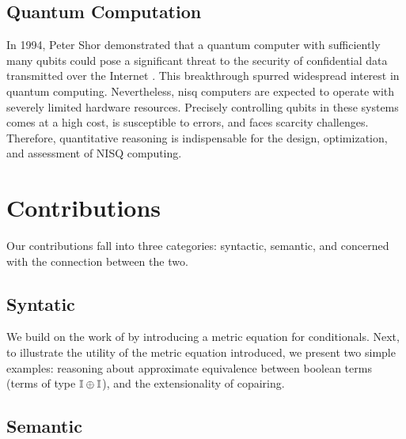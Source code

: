 \subsection*{Quantum Computation}

In 1994, Peter Shor demonstrated that a quantum computer with sufficiently many qubits could pose a significant threat to the security of confidential data transmitted over the Internet \cite{shor1994algorithms}. This breakthrough spurred widespread interest in quantum computing. Nevertheless, \acrfull{nisq}  computers are expected to operate with severely limited hardware resources. Precisely controlling qubits in these systems comes at a high cost, is susceptible to errors, and faces scarcity challenges. Therefore, quantitative reasoning is indispensable for the design, optimization, and assessment of NISQ computing. 







\section{Contributions}

Our contributions fall into three categories: syntactic, semantic, and  concerned with the connection between the two.

\subsection*{Syntatic}

We build on the work of \cite{dahlqvist2023syntactic} by introducing a metric equation for conditionals.  Next, to illustrate the utility of the metric equation introduced, we present two simple examples: reasoning about approximate equivalence between boolean terms (\ie terms of type $ \mathbb{I} \oplus \mathbb{I} $), and the extensionality of copairing.


\subsection*{Semantic}

